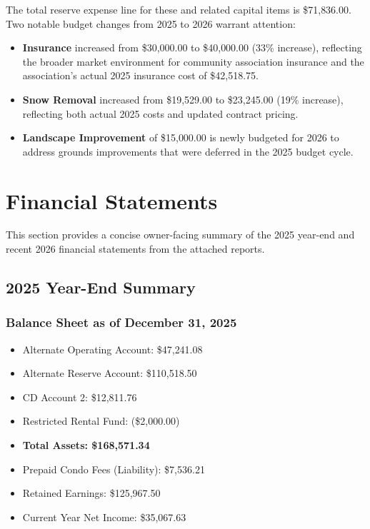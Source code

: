 \documentclass[11pt]{article}
\newcommand{\strong}[1]{\textbf{#1}}
\newcommand{\money}[1]{\$#1}
\begin{document}
\noindent
The total reserve expense line for these and related capital items is \money{71{,}836.00}.
Two notable budget changes from 2025 to 2026 warrant attention:

\begin{itemize}[leftmargin=1.1em]
    \item \strong{Insurance} increased from \money{30{,}000.00} to \money{40{,}000.00}
    (33\% increase), reflecting the broader market environment for community association
    insurance and the association's actual 2025 insurance cost of \money{42{,}518.75}.

    \item \strong{Snow Removal} increased from \money{19{,}529.00} to \money{23{,}245.00}
    (19\% increase), reflecting both actual 2025 costs and updated contract pricing.

    \item \strong{Landscape Improvement} of \money{15{,}000.00} is newly budgeted for 2026
    to address grounds improvements that were deferred in the 2025 budget cycle.
\end{itemize}

\newpage

\section{Financial Statements}

This section provides a concise owner-facing summary of the 2025 year-end and recent 2026
financial statements from the attached reports.

\subsection{2025 Year-End Summary}

\subsubsection*{Balance Sheet as of December 31, 2025}
\vspace{-0.6em}

\begin{itemize}[leftmargin=1.1em]
    \item Alternate Operating Account: \money{47{,}241.08}
    \item Alternate Reserve Account: \money{110{,}518.50}
    \item CD Account 2: \money{12{,}811.76}
    \item Restricted Rental Fund: (\money{2{,}000.00})
    \item \strong{Total Assets: \money{168{,}571.34}}
    \item Prepaid Condo Fees (Liability): \money{7{,}536.21}
    \item Retained Earnings: \money{125{,}967.50}
    \item Current Year Net Income: \money{35{,}067.63}
\end{itemize}
\end{document}
